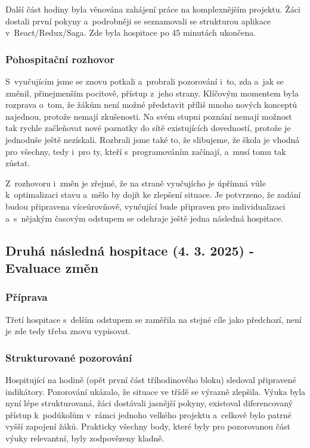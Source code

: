 Další část hodiny byla věnována zahájení práce na komplexnějším projektu. Žáci dostali první pokyny a~podrobněji se seznamovali se strukturou aplikace v~React/Redux/Saga. Zde byla hospitace po 45 minutách ukončena.

\subsubsection*{Pohospitační rozhovor}

S~vyučujícím jsme se znovu potkali a~probrali pozorování i~to, zda a~jak se změnil, přinejmenším pocitově,  přístup z~jeho strany. Klíčovým momentem byla rozprava o~tom, že žákům není možné představit příliš mnoho nových konceptů najednou, protože nemají zkušenosti. Na svém stupni poznání nemají možnost tak rychle začleňovat nové poznatky do sítě existujících dovedností, protože je jednoduše ještě nezískali. Rozbrali jsme také to, že slibujeme, že škola je vhodná pro všechny, tedy i~pro ty, kteří s~programováním začínají, a~musí tomu tak zůstat. 

Z~rozhovoru i~změn je zřejmé, že na straně vyučujícho je úpřímná vůle k~optimalizaci stavu a~mělo by dojít ke zlepšení situace. Je potvrzeno, že zadání budou připravena víceúrovňově, vyučující bude připraven pro individualizaci a~s~nějakým časovým odstupem se odehraje ještě jedna následná hospitace.

\subsection{Druhá následná hospitace (4. 3. 2025) - Evaluace změn}

\subsubsection*{Příprava}

Třetí hospitace s~delším odstupem se zaměřila na stejné cíle jako předchozí, není je zde tedy třeba znovu vypisovat.

\subsubsection*{Strukturované pozorování}

Hospitující na hodině (opět první část tříhodinového bloku) sledoval připravené indikátory. Pozorování ukázalo, že situace ve třídě se výrazně zlepšila. Výuka byla nyní lépe strukturovaná, žáci dostávali jasnější pokyny, existoval diferencovaný přístup k~podúkolům v~rámci jednoho velkého projektu a~celkově bylo patrné vyšší zapojení žáků. Prakticky všechny body, které byly pro pozorovanou část výuky relevantní, byly zodpovězeny kladně.

